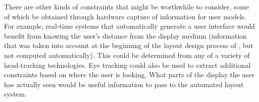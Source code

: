 		There are other kinds of constraints that might be worthwhile to consider,
		some of which be obtained through hardware capture of information for user
		models. For example, real-time systems that automatically generate a user
		interface would benefit from knowing the user’s distance from the display
		medium (information that was taken into account at the beginning of the
		layout design process of \citep{feiner-1}, but not computed automatically).
		This could be determined from any of a variety of head-tracking
		technologies. Eye tracking could also be used to extract additional
		constraints based on where the user is looking. What parts of the display
		the user has actually seen would be useful information to pass to the
		automated layout system.


